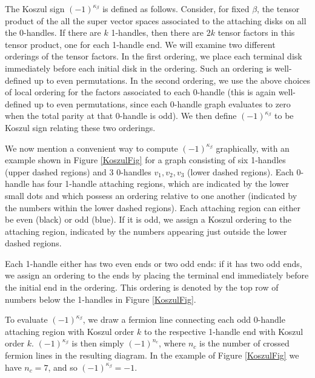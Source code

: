 The Koszul sign $(-1)^{\kappa_\beta}$ is defined as follows.
Consider, for fixed $\beta$, the tensor product of the all the super vector spaces
associated to the attaching disks on all the 0-handles.
If there are $k$ 1-handles, then there are $2k$ tensor factors in this tensor product, one 
for each 1-handle end. 
We will examine two different orderings of the tensor factors.
In the first ordering, we place each terminal disk immediately before each initial disk in the ordering.
Such an ordering is well-defined up to even permutations.
In the second ordering, we use the above choices of local ordering for the factors associated to
each 0-handle
(this is again well-defined up to even permutations, since each 0-handle graph evaluates to zero when the total
parity at that 0-handle is odd).
We then define $(-1)^{\kappa_\beta}$ to be Koszul sign relating these two orderings. 

We now mention a convenient way to compute $(-1)^{\kappa_\beta}$ graphically, with an 
example shown in Figure \ref{KoszulFig} for a graph consisting of six 1-handles (upper dashed regions) and 3 0-handles $v_1,v_2,v_3$ (lower dashed regions). 
Each 0-handle has four 1-handle attaching regions, which are indicated by the lower small dots and 
which possess an ordering relative to one another (indicated by the numbers within the lower dashed regions). Each attaching 
region can either be even (black) or odd (blue). If it is odd, we assign a Koszul ordering to the attaching
region, indicated by the numbers appearing just outside the lower dashed regions.

Each 1-handle either has two even ends or two odd ends: if it has two odd ends, we assign an ordering 
to the ends by placing the terminal end immediately before the initial end in the ordering. This ordering
is denoted by the top row of numbers below the 1-handles in Figure \ref{KoszulFig}. 

To evaluate $(-1)^{\kappa_\beta}$, we draw a fermion line connecting each odd 0-handle attaching region
with Koszul order $k$ to the respective 1-handle end with Koszul order $k$. $(-1)^{\kappa_\beta}$ is then 
simply $(-1)^{n_c}$, where $n_c$ is the number of crossed fermion lines in the resulting diagram. 
In the example of Figure \ref{KoszulFig} we have $n_c=7$, and so $(-1)^{\kappa_\beta}=-1$. 




